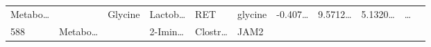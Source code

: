 \documentclass[
]{article}
\begin{document}
\begin{longtable}[]{@{}lllllllllll@{}}
\begin{minipage}[t]{0.07\columnwidth}
Metabo\ldots{}\strut
\end{minipage} & \begin{minipage}[t]{0.07\columnwidth}\raggedright
\strut
\end{minipage} & \begin{minipage}[t]{0.09\columnwidth}\raggedright
Glycine\strut
\end{minipage} & \begin{minipage}[t]{0.07\columnwidth}\raggedright
Lactob\ldots{}\strut
\end{minipage} & \begin{minipage}[t]{0.07\columnwidth}\raggedright
RET\strut
\end{minipage} & \begin{minipage}[t]{0.09\columnwidth}\raggedright
glycine\strut
\end{minipage} & \begin{minipage}[t]{0.07\columnwidth}\raggedright
-0.407\ldots{}\strut
\end{minipage} & \begin{minipage}[t]{0.07\columnwidth}\raggedright
9.5712\ldots{}\strut
\end{minipage} & \begin{minipage}[t]{0.07\columnwidth}\raggedright
5.1320\ldots{}\strut
\end{minipage} & \begin{minipage}[t]{0.03\columnwidth}\raggedright
\ldots{}\strut
\end{minipage}\tabularnewline
\begin{minipage}[t]{0.03\columnwidth}\raggedright
588\strut
\end{minipage} & \begin{minipage}[t]{0.07\columnwidth}\raggedright
Metabo\ldots{}\strut
\end{minipage} & \begin{minipage}[t]{0.07\columnwidth}\raggedright
\strut
\end{minipage} & \begin{minipage}[t]{0.09\columnwidth}\raggedright
2-Imin\ldots{}\strut
\end{minipage} & \begin{minipage}[t]{0.07\columnwidth}\raggedright
Clostr\ldots{}\strut
\end{minipage} & \begin{minipage}[t]{0.07\columnwidth}\raggedright
JAM2\strut
\end{minipage} & \begin{minipage}[t]{0.09\columnwidth}\raggedright

\end{minipage}
\end{longtable}
\end{document}
